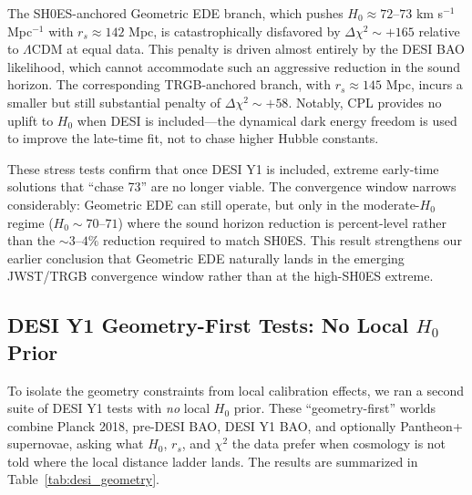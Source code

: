 \documentclass[a4paper,11pt]{article}
\begin{document}
The SH0ES-anchored Geometric EDE branch, which pushes $H_0 \approx 72$--$73$ km s$^{-1}$ Mpc$^{-1}$ with $r_s \approx 142$ Mpc, is catastrophically disfavored by $\Delta\chi^2 \sim +165$ relative to $\Lambda$CDM at equal data. This penalty is driven almost entirely by the DESI BAO likelihood, which cannot accommodate such an aggressive reduction in the sound horizon. The corresponding TRGB-anchored branch, with $r_s \approx 145$ Mpc, incurs a smaller but still substantial penalty of $\Delta\chi^2 \sim +58$. Notably, CPL provides no uplift to $H_0$ when DESI is included---the dynamical dark energy freedom is used to improve the late-time fit, not to chase higher Hubble constants.

These stress tests confirm that once DESI Y1 is included, extreme early-time solutions that ``chase 73'' are no longer viable. The convergence window narrows considerably: Geometric EDE can still operate, but only in the moderate-$H_0$ regime ($H_0 \sim 70$--$71$) where the sound horizon reduction is percent-level rather than the $\sim 3$--$4\%$ reduction required to match SH0ES. This result strengthens our earlier conclusion that Geometric EDE naturally lands in the emerging JWST/TRGB convergence window rather than at the high-SH0ES extreme.

\subsection*{DESI Y1 Geometry-First Tests: No Local $H_0$ Prior}

To isolate the geometry constraints from local calibration effects, we ran a second suite of DESI Y1 tests with \emph{no} local $H_0$ prior. These ``geometry-first'' worlds combine Planck 2018, pre-DESI BAO, DESI Y1 BAO, and optionally Pantheon+ supernovae, asking what $H_0$, $r_s$, and $\chi^2$ the data prefer when cosmology is not told where the local distance ladder lands. The results are summarized in Table~\ref{tab:desi_geometry}.
\end{document}
